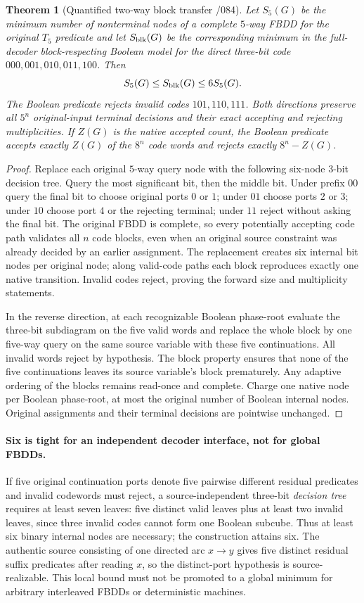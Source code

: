 \documentclass[11pt]{article}
\newtheorem{theorem}{Theorem}
\begin{document}
\begin{theorem}[Quantified two-way block transfer /084]
Let $S_5(G)$ be the minimum number of nonterminal nodes of a
complete $5$-way FBDD for the original $T_5$ predicate and
let $S_{\rm blk}(G)$ be the corresponding minimum in the
full-decoder block-respecting Boolean model for the direct
three-bit code $000,001,010,011,100$. Then
\[
 S_5(G)\le S_{\rm blk}(G)\le 6S_5(G).
\]
The Boolean predicate rejects invalid codes $101,110,111$.
Both directions preserve all $5^n$ original-input terminal
decisions and their exact accepting and rejecting multiplicities.
If $Z(G)$ is the native accepted count, the Boolean predicate
accepts exactly $Z(G)$ of the $8^n$ code words and rejects
exactly $8^n-Z(G)$.
\end{theorem}
\begin{proof}
Replace each original $5$-way query node with the following
six-node $3$-bit decision tree. Query the most significant bit,
then the middle bit. Under prefix $00$ query the final bit to
choose original ports $0$ or $1$; under $01$ choose ports $2$
or $3$; under $10$ choose port $4$ or the rejecting terminal;
under $11$ reject without asking the final bit. The original
FBDD is complete, so every potentially accepting code path
validates all $n$ code blocks, even when an original source
constraint was already decided by an earlier assignment.
The replacement creates six internal bit nodes per original
node; along valid-code paths each block reproduces exactly one
native transition. Invalid codes reject, proving the forward
size and multiplicity statements.

In the reverse direction, at each recognizable Boolean
phase-root evaluate the three-bit subdiagram on the five valid
words and replace the whole block by one five-way query
on the same source variable with these five continuations.
All invalid words reject by hypothesis. The block property
ensures that none of the five continuations leaves its
source variable's block prematurely. Any adaptive ordering
of the blocks remains read-once and complete. Charge one
native node per Boolean phase-root, at most the original number
of Boolean internal nodes. Original assignments and their
terminal decisions are pointwise unchanged.
\end{proof}

\paragraph{Six is tight for an independent decoder interface,
not for global FBDDs.}
If five original continuation ports denote five pairwise
different residual predicates and invalid codewords must
reject, a source-independent three-bit \emph{decision tree}
requires at least seven leaves: five distinct valid leaves
plus at least two invalid leaves, since three invalid codes
cannot form one Boolean subcube. Thus at least six binary
internal nodes are necessary; the construction attains six.
The authentic source consisting of one directed arc $x\to y$
gives five distinct residual suffix predicates after reading
$x$, so the distinct-port hypothesis is source-realizable.
This local bound must not be promoted to a global minimum
for arbitrary interleaved FBDDs or deterministic machines.
\end{document}
